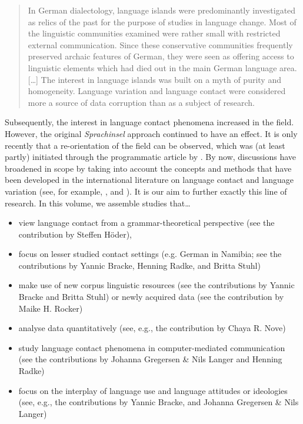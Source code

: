 \documentclass[output=paper]{langsci/langscibook}
\begin{document}
\begin{quote}
In German dialectology, language islands were predominantly investigated as relics of the past for the purpose of studies in language change. Most of the linguistic communities examined were rather small with restricted external communication. Since these conservative communities frequently preserved archaic features of German, they were seen as offering access to linguistic elements which had died out in the main German language area. […] The interest in language islands was built on a myth of purity and homogeneity. Language variation and language contact were considered more a source of data corruption than as a subject of research. \citep[222–223]{Rosenberg2005}
\end{quote}

Subsequently, the interest in language contact phenomena increased in the field. However, the original \textit{Sprachinsel} approach continued to have an effect. It is only recently that a re-orientation of the field can be observed, which was (at least partly) initiated through the programmatic article by \citet{mattheier_theorie_1994}. By now, discussions have broadened in scope by taking into account the concepts and methods that have been developed in the international literature on language contact and language variation (see, for example, \citealt{putnam_studies_2011}, \citealt{page_moribund_2015} and \citealt{boas_constructions_2018}). It is our aim to further exactly this line of research. In this volume, we assemble studies that…
     
\begin{itemize}
\item view language contact from a grammar-theoretical perspective (see the contribution by Steffen Höder),
\item focus on lesser studied contact settings (e.g. German in Namibia; see the contributions by Yannic Bracke, Henning Radke, and Britta Stuhl) 
\item make use of new corpus linguistic resources (see the contributions by Yannic Bracke and Britta Stuhl) or newly acquired data (see the contribution by Maike H. Rocker)
\item analyse data quantitatively (see, e.g., the contribution by Chaya R. Nove)
\item study language contact phenomena in computer-mediated communication (see the contributions by Johanna Gregersen \& Nils Langer and Henning Radke)
\item focus on the interplay of language use and language attitudes or ideologies (see, e.g., the contributions by Yannic Bracke, and Johanna Gregersen \& Nils Langer)
\end{itemize}
\end{document}
